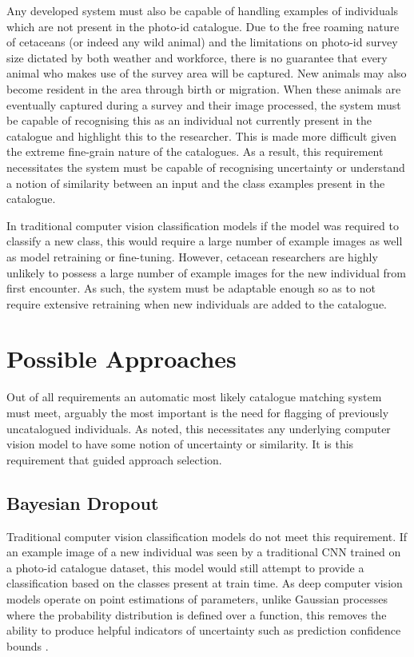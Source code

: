 Any developed system must also be capable of handling examples of individuals which are not present in the photo-id catalogue. Due to the free roaming nature of cetaceans (or indeed any wild animal) and the limitations on photo-id survey size dictated by both weather and workforce, there is no guarantee that every animal who makes use of the survey area will be captured. New animals may also become resident in the area through birth or migration. When these animals are eventually captured during a survey and their image processed, the system must be capable of recognising this as an individual not currently present in the catalogue and highlight this to the researcher. This is made more difficult given the extreme fine-grain nature of the catalogues. As a result, this requirement necessitates the system must be capable of recognising uncertainty or understand a notion of similarity between an input and the class examples present in the catalogue. 

In traditional computer vision classification models if the model was required to classify a new class, this would require a large number of example images as well as model retraining or fine-tuning. However, cetacean researchers are highly unlikely to possess a large number of example images for the new individual from first encounter. As such, the system must be adaptable enough so as to not require extensive retraining when new individuals are added to the catalogue.

\section{Possible Approaches}\label{ch:ID,sec:deciding}

Out of all requirements an automatic most likely catalogue matching system must meet, arguably the most important is the need for flagging of previously uncatalogued individuals. As noted, this necessitates any underlying computer vision model to have some notion of uncertainty or similarity. It is this requirement that guided approach selection. 

\subsection{Bayesian Dropout}\label{ch:ID,sec:deciding,sub:bayesianDropout}

Traditional computer vision classification models do not meet this requirement. If an example image of a new individual was seen by a traditional CNN trained on a photo-id catalogue dataset, this model would still attempt to provide a classification based on the classes present at train time.  As deep computer vision models operate on point estimations of parameters, unlike Gaussian processes where the probability distribution is defined over a function, this removes the ability to produce helpful indicators of uncertainty such as prediction confidence bounds \cite{gal_uncertainty_2016}. 

